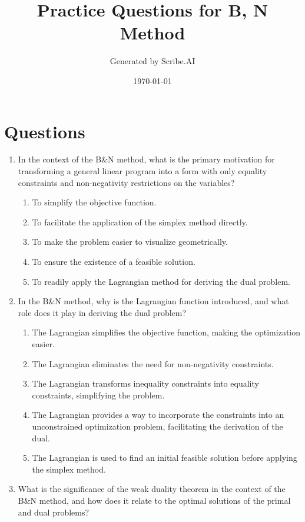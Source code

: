 \documentclass{article}%
\title{Practice Questions for B, N Method}%
\author{Generated by Scribe.AI}%
\date{\today}%
\begin{document}
%
\normalsize%
\maketitle%
\section{Questions}%
\label{sec:Questions}%
\begin{enumerate}%
\item In the context of the B\&N method, what is the primary motivation for transforming a general linear program into a form with only equality constraints and non-negativity restrictions on the variables?%
\begin{enumerate}%
\item To simplify the objective function.%
\item To facilitate the application of the simplex method directly.%
\item To make the problem easier to visualize geometrically.%
\item To ensure the existence of a feasible solution.%
\item To readily apply the Lagrangian method for deriving the dual problem.%
\end{enumerate}%
\vspace{1em}%
\item In the B\&N method, why is the Lagrangian function introduced, and what role does it play in deriving the dual problem?%
\begin{enumerate}%
\item The Lagrangian simplifies the objective function, making the optimization easier.%
\item The Lagrangian eliminates the need for non-negativity constraints.%
\item The Lagrangian transforms inequality constraints into equality constraints, simplifying the problem.%
\item The Lagrangian provides a way to incorporate the constraints into an unconstrained optimization problem, facilitating the derivation of the dual.%
\item The Lagrangian is used to find an initial feasible solution before applying the simplex method.%
\end{enumerate}%
\vspace{1em}%
\item What is the significance of the weak duality theorem in the context of the B\&N method, and how does it relate to the optimal solutions of the primal and dual problems?%

\end{enumerate}
\end{document}
